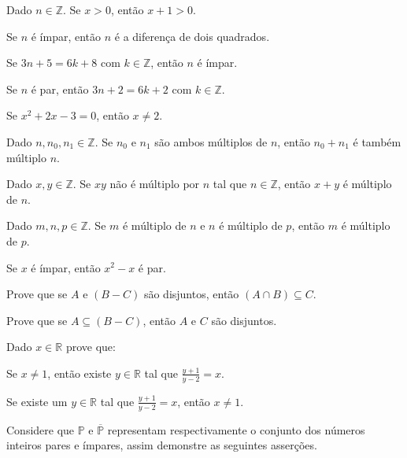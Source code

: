 \begin{exerList}
	\item Dado $n \in \mathbb{Z}$. Se $x > 0$, então $x + 1 > 0$.
	\item Se $n$ é ímpar, então $n$ é a diferença de dois quadrados.
	\item Se $3n + 5 = 6k + 8$ com $k \in \mathbb{Z}$, então $n$ é ímpar.
	\item Se $n$ é par, então $3n + 2 = 6k + 2$ com $k \in \mathbb{Z}$.
	\item Se $x^2 + 2x - 3 = 0$, então $x \neq 2$.
	\item Dado $n, n_0, n_1 \in \mathbb{Z}$. Se $n_0$ e $n_1$ são ambos múltiplos de $n$, então $n_0 + n_1$ é também múltiplo $n$.
	\item Dado $x, y \in \mathbb{Z}$. Se $xy$ não é múltiplo por $n$ tal que $n \in \mathbb{Z}$, então $x + y$ é múltiplo de $n$.
  \item Dado $m, n, p \in \mathbb{Z}$. Se $m$ é múltiplo de $n$ e $n$ é múltiplo de $p$, então $m$ é múltiplo de $p$.
	\item Se $x$ é ímpar, então $x^2 - x$ é par.
\end{exerList}

\begin{questao}\label{test:Demosntracoes2}
	Prove que se $A$ e $(B - C)$ são disjuntos, então $(A \cap B) \subseteq C$.
\end{questao}

\begin{questao}\label{test:Demosntracoes3}
	Prove que se $A \subseteq (B - C)$, então $A$ e $C$ são disjuntos.
\end{questao}

\begin{questao}\label{test:Demosntracoes4}
	Dado $x \in \mathbb{R}$ prove que:
\end{questao}

\begin{exerList}
	\item Se $x \neq 1$, então existe $y \in \mathbb{R}$ tal que $\frac{y+1}{y-2} = x$.
	\item Se existe um $y \in \mathbb{R}$ tal que  $\frac{y+1}{y-2} = x$, então $x \neq 1$.
\end{exerList}

\begin{questao}\label{test:Demosntracoes8}
	Considere que $\mathbb{P}$ e $\overline{\mathbb{P}}$ representam respectivamente o conjunto dos números inteiros pares e ímpares, assim demonstre as seguintes asserções. 
\end{questao}


